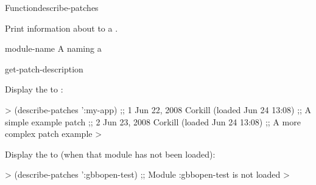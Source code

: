 \documentclass[10pt,twoside,english,pdftex]{article}
\begin{document}

\begin{functiondoc}{Function}{describe-patches}{}
%

\fnsyntax 

\fnpurpose Print information about   to a
.

\fnpackage {}

\fnmodule {}

\fnargs
\begin{args}{module-name}
 A  naming a 
\end{args}

\fnerrors
\modulenotdefined

\begin{alsos}{get-patch-description}
\also[patch]
\end{alsos}

\fnexamples
%
Display the  to  :
%
\W\supp
\begin{example}
  > (describe-patches ':my-app)
  ;; 1      Jun 22, 2008 Corkill (loaded Jun 24 13:08)
  ;;           A simple example patch
  ;; 2      Jun 23, 2008 Corkill (loaded Jun 24 13:08)
  ;;           A more complex patch example
  >
\end{example}

Display the  to  
(when that module has not been loaded):
%
\W\supp
\begin{example}
  > (describe-patches ':gbbopen-test)
  ;; Module :gbbopen-test is not loaded
  >
\end{example}

\end{functiondoc}

\end{document}
